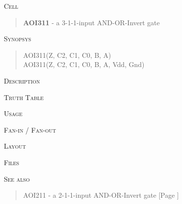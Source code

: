 
\label{AOI311}
\textsc{Cell}
\begin{quote}
    \textbf{AOI311} - a 3-1-1-input AND-OR-Invert gate
\end{quote}

\textsc{Synopsys}
\begin{quote}
    AOI311(Z, C2, C1, C0, B, A) \\
    AOI311(Z, C2, C1, C0, B, A, Vdd, Gnd)
\end{quote}

\textsc{Description}

%

\textsc{Truth Table}


\textsc{Usage}

\textsc{Fan-in / Fan-out}

\textsc{Layout}

\textsc{Files}

\textsc{See also}
\begin{quote}
    AOI211 - a 2-1-1-input AND-OR-Invert gate [Page \pageref{AOI211}]
\end{quote}
